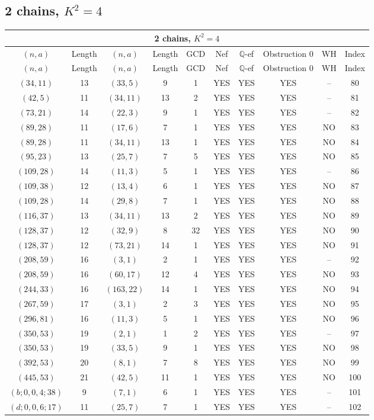 \subsection{2 chains, $K^2 = 4$}
\begin{longtable}{|c|c|c|c|c|c|c|c|c|c|}
\hline
\multicolumn{10}{|c|}{2 chains, $K^2 = 4$}\\
\hline
$(n,a)$ & Length & $(n,a)$ & Length & GCD & Nef & $\mathbb Q$-ef & Obstruction 0 & WH & Index\\
\hline
\endfirsthead

\hline
$(n,a)$ & Length & $(n,a)$ & Length & GCD & Nef & $\mathbb Q$-ef & Obstruction 0 & WH & Index\\
\hline
\endhead
\hline
\endfoot

$(34, 11)$ & 13 & $(33, 5)$ & 9 & 1 & YES & YES & YES & -- & 80\\
$(42, 5)$ & 11 & $(34, 11)$ & 13 & 2 & YES & YES & YES & -- & 81\\
$(73, 21)$ & 14 & $(22, 3)$ & 9 & 1 & YES & YES & YES & -- & 82\\
$(89, 28)$ & 11 & $(17, 6)$ & 7 & 1 & YES & YES & YES & NO & 83\\
$(89, 28)$ & 11 & $(34, 11)$ & 13 & 1 & YES & YES & YES & NO & 84\\
$(95, 23)$ & 13 & $(25, 7)$ & 7 & 5 & YES & YES & YES & NO & 85\\
$(109, 28)$ & 14 & $(11, 3)$ & 5 & 1 & YES & YES & YES & -- & 86\\
$(109, 38)$ & 12 & $(13, 4)$ & 6 & 1 & YES & YES & YES & NO & 87\\
$(109, 28)$ & 14 & $(29, 8)$ & 7 & 1 & YES & YES & YES & NO & 88\\
$(116, 37)$ & 13 & $(34, 11)$ & 13 & 2 & YES & YES & YES & NO & 89\\
$(128, 37)$ & 12 & $(32, 9)$ & 8 & 32 & YES & YES & YES & NO & 90\\
$(128, 37)$ & 12 & $(73, 21)$ & 14 & 1 & YES & YES & YES & NO & 91\\
$(208, 59)$ & 16 & $(3, 1)$ & 2 & 1 & YES & YES & YES & -- & 92\\
$(208, 59)$ & 16 & $(60, 17)$ & 12 & 4 & YES & YES & YES & NO & 93\\
$(244, 33)$ & 16 & $(163, 22)$ & 14 & 1 & YES & YES & YES & NO & 94\\
$(267, 59)$ & 17 & $(3, 1)$ & 2 & 3 & YES & YES & YES & NO & 95\\
$(296, 81)$ & 16 & $(11, 3)$ & 5 & 1 & YES & YES & YES & NO & 96\\
$(350, 53)$ & 19 & $(2, 1)$ & 1 & 2 & YES & YES & YES & -- & 97\\
$(350, 53)$ & 19 & $(33, 5)$ & 9 & 1 & YES & YES & YES & NO & 98\\
$(392, 53)$ & 20 & $(8, 1)$ & 7 & 8 & YES & YES & YES & NO & 99\\
$(445, 53)$ & 21 & $(42, 5)$ & 11 & 1 & YES & YES & YES & NO & 100\\
$(b; 0, 0, 4; 38)$ & 9 & $(7, 1)$ & 6 & 1 & YES & YES & YES & -- & 101\\
$(d; 0, 0, 6; 17)$ & 11 & $(25, 7)$ & 7 & 1 & YES & YES & YES & -- & 102
\end{longtable}
